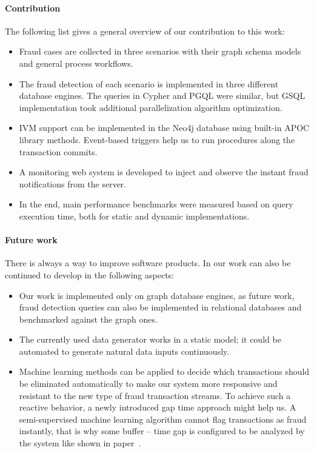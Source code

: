 \paragraph{Contribution}

The following list gives a general overview of our contribution to this work:

\begin{itemize}
  \item Fraud cases are collected in three scenarios with their graph schema models and general process workflows.
  \item The fraud detection of each scenario is implemented in three different database engines. 
  The queries in Cypher and PGQL were similar, but GSQL implementation took additional parallelization algorithm optimization.
  \item IVM support can be implemented in the Neo4j database using built-in APOC library methods. Event-based triggers help us to run procedures along the transaction commits.
  \item A monitoring web system is developed to inject and observe the instant fraud notifications from the server.
  \item In the end, main performance benchmarks were measured based on query execution time, both for static and dynamic implementations.
\end{itemize}

\paragraph{Future work}

There is always a way to improve software products. In our work can also be continued to develop in the following aspects: 

\begin{itemize}
  \item Our work is implemented only on graph database engines, as future work, fraud detection queries can also be implemented in relational databases and benchmarked against the graph ones.
  \item The currently used data generator works in a static model; it could be automated to generate natural data inputs continuously.
  \item Machine learning methods can be applied to decide which transactions should be eliminated automatically to make our system more responsive and resistant to the new type of fraud transaction streams.
  To achieve such a reactive behavior, a newly introduced gap time approach might help us.
  A semi-supervised machine learning algorithm cannot flag transactions as fraud instantly, that is why some buffer -- time gap is configured to be analyzed by the system like shown in paper~\cite{DBLP:conf/complexnetworks/LebichotBCS16}.
\end{itemize}
